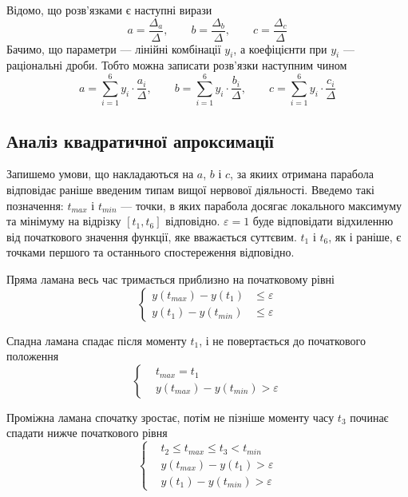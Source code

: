Відомо, що розв’язками є наступні вирази
\begin{equation*}
  a = \frac{\Delta_a}{\Delta},\qquad
  b = \frac{\Delta_b}{\Delta},\qquad
  c = \frac{\Delta_c}{\Delta}
\end{equation*}
Бачимо, що параметри --- лінійні комбінації $y_i$, а коефіцієнти при $y_i$ ---
раціональні дроби.
Тобто можна записати розв’язки наступним чином
\begin{equation*}
  a = \sum_{i=1}^{6} y_i \cdot \frac{a_i}{\Delta},\qquad
  b = \sum_{i=1}^{6} y_i \cdot \frac{b_i}{\Delta},\qquad
  c = \sum_{i=1}^{6} y_i \cdot \frac{c_i}{\Delta}
\end{equation*}

\subsection{Аналіз квадратичної апроксимації}

Запишемо умови, що накладаються на $a$, $b$ і $c$, за якиих отримана
парабола відповідає раніше введеним типам вищої нервової діяльності.
Введемо такі позначення: $t_{max}$ і $t_{min}$ --- точки, в яких парабола
досягає локального максимуму та мінімуму на відрізку $\left[ t_1, t_6 \right]$
відповідно.
$\varepsilon = 1$ буде відповідати відхиленню від початкового
значення функції, яке вважається суттєвим.
$t_1$ і $t_6$, як і раніше, є точками першого та останнього спостереження
відповідно.

Пряма ламана весь час тримається приблизно на початковому рівні
\begin{equation*}
  \begin{cases}
    y\left( t_{max} \right) - y\left( t_1 \right) &\le \varepsilon \\
    y\left( t_1 \right) - y\left( t_{min} \right)   &\le \varepsilon
  \end{cases}
\end{equation*}

Спадна ламана спадає після моменту $t_1$, і не повертається до початкового
положення
\begin{equation*}
  \begin{cases}
    &t_{max} = t_1 \\
    &y\left( t_{max} \right) - y\left( t_{min} \right) > \varepsilon
  \end{cases}
\end{equation*}

Проміжна ламана спочатку зростає, потім не пізніше моменту часу $t_3$ починає
спадати нижче початкового рівня
\begin{equation*}
  \begin{cases}
    &t_2 \le t_{max} \le t_3 < t_{min} \\
    &y\left( t_{max} \right) - y\left( t_1\right) > \varepsilon \\
    &y\left( t_1 \right) - y\left( t_{min} \right) > \varepsilon
  \end{cases}
\end{equation*}

